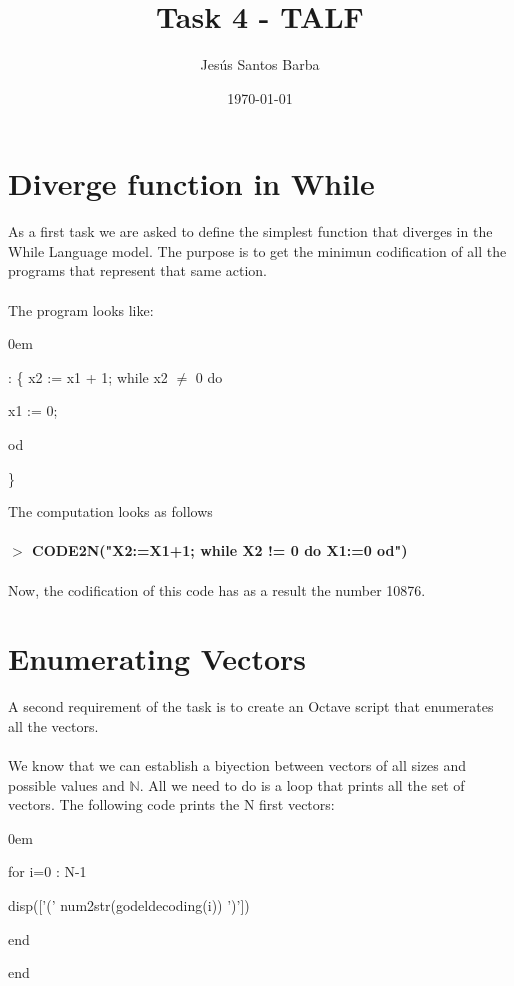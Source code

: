 \documentclass[11pt]{article}
\title{\textbf{Task 4 - TALF}}
\author{Jesús Santos Barba}
\date{\today}
\begin{document}
\maketitle
\thispagestyle{empty}

\section{Diverge function in While}

As a first task we are asked to define the simplest function that diverges in the While Language model. The purpose is to get the minimun codification of all the programs that represent that same action.
\\\\
The program looks like:

\begin{description}
\addtolength{\itemindent}{0.80cm}
\itemsep0em 
\item[diverge = (0, s)] 
\item[s] : \{
	\subitem x2 := x1 + 1; 
	\subitem while x2 $\neq$ 0 do
	
\setlength\parindent{1.3cm}
			
			\subitem	x1 := 0;
					
\setlength\parindent{0.00cm}									
	\subitem od

\}
\\
\end{description}
The computation looks as follows 
\\\\
\textbf{$>$ CODE2N("X2:=X1+1; while X2 != 0 do  X1:=0 od")}
\\\\
Now, the codification of this code has as a result the number 10876.

\section{Enumerating Vectors}
A second requirement of the task is to create an Octave script that enumerates all the vectors. 
\\\\
We know that we can establish a biyection between vectors of all sizes and possible values and $\mathbb{N}$. All we need to do is a loop that prints all the set of vectors. The following code prints the N first vectors:

\begin{description}
\itemsep0em 
\item [function printNVectors(N)]
\item for i=0 : N-1
\addtolength{\itemindent}{0.80cm}
\item disp(['(' num2str(godeldecoding(i)) ')'])
\addtolength{\itemindent}{0.00cm}
\item end
\item end
\end{description}
\end{document}
